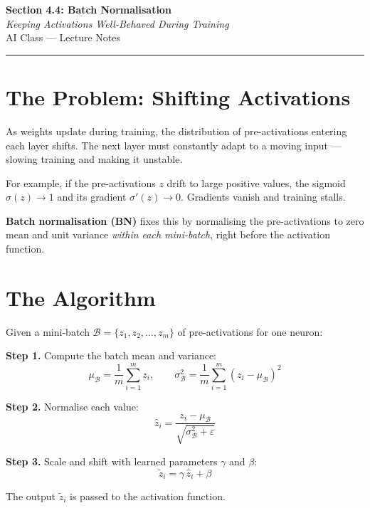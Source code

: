 \documentclass[12pt, a4paper]{article}
\newif\ifstudentmode
\theoremstyle{definition}
\newcommand{\muB}{\mu_{\mathcal{B}}}
\newcommand{\sigB}{\sigma^2_{\mathcal{B}}}
\begin{document}
\begin{center}
  {\LARGE \textbf{Section 4.4: Batch Normalisation}} \\[0.3em]
  {\large\itshape Keeping Activations Well-Behaved During Training} \\[0.5em]
  {\large AI Class --- Lecture Notes}%
  \ifstudentmode\quad{\normalsize\color{gray}[Student Copy]}\fi
\end{center}

\vspace{1em}\hrule\vspace{1.5em}

\section{The Problem: Shifting Activations}

As weights update during training, the distribution of pre-activations
entering each layer shifts.  The next layer must constantly adapt to a
moving input --- slowing training and making it unstable.

For example, if the pre-activations $z$ drift to large positive values,
the sigmoid $\sigma(z) \to 1$ and its gradient $\sigma'(z) \to 0$.
Gradients vanish and training stalls.

\textbf{Batch normalisation (BN)} fixes this by normalising the
pre-activations to zero mean and unit variance \emph{within each
mini-batch}, right before the activation function.

\section{The Algorithm}

Given a mini-batch $\mathcal{B} = \{z_1, z_2, \ldots, z_m\}$ of
pre-activations for one neuron:

\begin{resultbox}
\textbf{Step 1.} Compute the batch mean and variance:
\[
  \muB = \frac{1}{m}\sum_{i=1}^{m} z_i,
  \qquad
  \sigB = \frac{1}{m}\sum_{i=1}^{m}(z_i - \muB)^2
\]

\textbf{Step 2.} Normalise each value:
\[
  \hat{z}_i = \frac{z_i - \muB}{\sqrt{\sigB + \varepsilon}}
\]

\textbf{Step 3.} Scale and shift with learned parameters $\gamma$ and $\beta$:
\[
  \tilde{z}_i = \gamma\,\hat{z}_i + \beta
\]

The output $\tilde{z}_i$ is passed to the activation function.
\end{resultbox}
\end{document}
